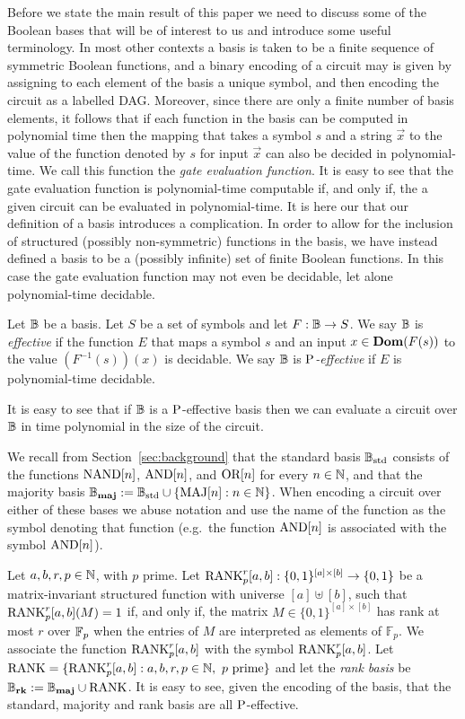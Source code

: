\documentclass[../main/thesis.tex]{subfiles}
\begin{document}
Before we state the main result of this paper we need to discuss some of the
Boolean bases that will be of interest to us and introduce some useful
terminology. In most other contexts a basis is taken to be a finite sequence of
symmetric Boolean functions, and a binary encoding of a circuit may is given by
assigning to each element of the basis a unique symbol, and then encoding the
circuit as a labelled DAG. Moreover, since there are only a finite number of
basis elements, it follows that if each function in the basis can be computed in
polynomial time then the mapping that takes a symbol $s$ and a string $\vec{x}$
to the value of the function denoted by $s$ for input $\vec{x}$ can also be
decided in polynomial-time. We call this function the \emph{gate evaluation
  function}. It is easy to see that the gate evaluation function is
polynomial-time computable if, and only if, the a given circuit can be evaluated
in polynomial-time. It is here our that our definition of a basis introduces a
complication. In order to allow for the inclusion of structured (possibly
non-symmetric) functions in the basis, we have instead defined a basis to be a
(possibly infinite) set of finite Boolean functions. In this case the gate
evaluation function may not even be decidable, let alone polynomial-time
decidable.

\begin{definition}
  Let $\mathbb{B}$ be a basis. Let $S$ be a set of symbols and let $F : \mathbb{B} \rightarrow
  S$. We say $\mathbb{B}$ is \emph{effective} if the function $E$ that maps a symbol
  $s$ and an input $x \in \text{\textbf{Dom}}(F(s))$ to the value $(F^{-1}(s))(x)$ is
  decidable. We say $\mathbb{B}$ is \emph{$\mathrm{P}$-effective} if $E$ is polynomial-time
  decidable.
\end{definition}

It is easy to see that if $\mathbb{B}$ is a $\mathrm{P}$-effective basis then we can evaluate
a circuit over $\mathbb{B}$ in time polynomial in the size of the circuit.

We recall from Section~\ref{sec:background} that the standard basis $\mathbb{B}_{\text{std}}$
consists of the functions $\text{\upshape NAND}[n]$, $\text{\upshape AND}[n]$, and $\text{\upshape OR}[n]$ for every $n \in
\mathbb{N}$, and that the majority basis $\mathbb{B}_{\text{\textbf{maj}}} := \mathbb{B}_{\text{std}} \cup \{\text{\upshape MAJ}[n] : n \in \mathbb{N}\}$.
When encoding a circuit over either of these bases we abuse notation and use the
name of the function as the symbol denoting that function (e.g.\ the function
$\text{\upshape AND}[n]$ is associated with the symbol $\text{\upshape AND}[n]$).

Let $a, b, r, p \in \mathbb{N}$, with $p$ prime. Let $\text{\upshape RANK}^r_p[a,b] : \{0,1\}^{[a]
  \times [b]} \rightarrow \{0,1\}$ be a matrix-invariant structured function
with universe $[a] \uplus [b]$, such that $\text{\upshape RANK}^r_p[a,b](M) = 1$ if, and only
if, the matrix $M \in \{0,1\}^{[a] \times [b]}$ has rank at most $r$ over
$\mathbb{F}_p$ when the entries of $M$ are interpreted as elements of $\mathbb{F}_p$.
We associate the function $\text{\upshape RANK}^{r}_p[a,b]$ with the symbol $\text{\upshape RANK}^{r}_p[a,b]$.
Let $\text{\upshape RANK} = \{\text{\upshape RANK}^{r}_p[a,b] : a, b, r, p \in \mathbb{N}, \text{ $p$ prime}\}$ and
let the \emph{rank basis} be $\mathbb{B}_{\text{\textbf{rk}}} := \mathbb{B}_{\text{\textbf{maj}}} \cup \text{\upshape RANK}$. It is easy to see, given
the encoding of the basis, that the standard, majority and rank basis are all
$\mathrm{P}$-effective.
\end{document}
